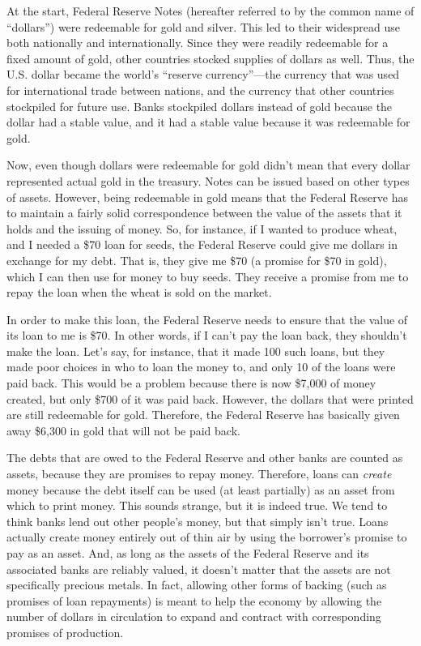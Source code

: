 At the start, Federal Reserve Notes (hereafter referred to by the common
name of “dollars”) were redeemable for gold and silver. This led to
their widespread use both nationally and internationally. Since they
were readily redeemable for a fixed amount of gold, other countries
stocked supplies of dollars as well. Thus, the U.S. dollar became the
world’s “reserve currency”—the currency that was used for international
trade between nations, and the currency that other countries stockpiled
for future use. Banks stockpiled dollars instead of gold because the dollar had a stable value, and it
had a stable value because it was redeemable for gold.

Now, even though dollars were redeemable for gold didn’t mean that every
dollar represented actual gold in the treasury. Notes can be issued
based on other types of assets. However, being redeemable in gold means
that the Federal Reserve has to maintain a fairly solid correspondence
between the value of the assets that it holds and the issuing of money.
So, for instance, if I wanted to produce wheat, and I needed a \$70
loan for seeds, the Federal Reserve could give me dollars in exchange for my
debt. That is, they give me \$70 (a promise for \$70 in gold), which I
can then use for money to buy seeds. They receive a promise from me to repay the
loan when the wheat is sold on the market. 

In order to make this loan, the Federal Reserve needs to ensure that the
value of its loan to me is \$70. In other words, if I can't pay the loan
back, they shouldn't make the loan.  Let’s say, for instance, that it made
100 such loans, but they made poor choices in who to loan the money to, 
and only 10 of the loans were paid back. This would be a
problem because there is now \$7,000 of money created, but only \$700
of it was paid back. However, the dollars that were printed are still
redeemable for gold. Therefore, the Federal Reserve has basically given
away \$6,300 in gold that will not be paid back. 

The debts that are owed to the Federal Reserve and other banks are counted as assets, 
because they are promises to repay money.  Therefore, loans can \textit{create}
money because the debt itself can be used (at least partially) as an asset from which to print money.
This sounds strange, but it is indeed true.  We tend to think banks lend out
other people's money, but that simply isn't true.  Loans actually create money entirely out of 
thin air by using the
borrower's promise to pay as an asset.  And, as long as the assets
of the Federal Reserve and its associated banks are reliably valued, it doesn’t matter
that the assets are not specifically precious metals. In fact, allowing other
forms of backing (such as promises of loan repayments) is meant to help the economy
by allowing the
number of dollars in circulation to expand and contract with
corresponding promises of production. 

